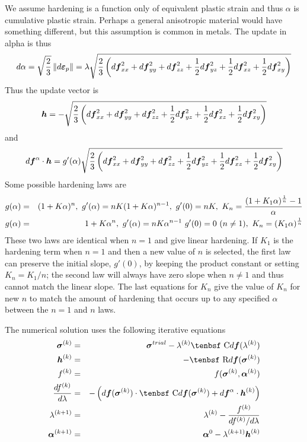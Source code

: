 \documentclass[11pt]{book}
\renewcommand{\vec}[1]{\boldsymbol{#1}}
\def\C{\hbox{\tenbsf C}}
\def\dpl{d \vec{\varepsilon}_{p}}
\def\df{d \vec{f}}
\def\dfa{d \vec{f}^\alpha}
\def\R{\hbox{\tenbsf R}}
\begin{document}
We assume hardening is a function only of equivalent plastic strain and thus $\alpha$ is cumulative plastic strain. Perhaps a general anisotropic material would have something different, but this assumption is common in metals. The update in alpha is thus
\begin{equation}
     d\alpha = \sqrt{2\over 3}\thinspace \| \dpl\| = \lambda \sqrt{{2\over 3}\left(\df_{xx}^2 + \df_{yy}^2 + \df_{zz}^2 + {1\over2}\df_{yz}^2+ {1\over2}\df_{xz}^2+ {1\over2}\df_{xy}^2\right)}
\end{equation}
Thus the update vector is
\begin{equation}
      \vec h = - \sqrt{{2\over 3}\left(\df_{xx}^2 + \df_{yy}^2 + \df_{zz}^2 + {1\over2}\df_{yz}^2+ {1\over2}\df_{xz}^2+ {1\over2}\df_{xy}^2\right)}
\end{equation}
and
\begin{equation}
   \dfa \cdot \vec h =  g'(\alpha)\sqrt{{2\over 3}\left(\df_{xx}^2 + \df_{yy}^2 + \df_{zz}^2 + {1\over2}\df_{yz}^2+ {1\over2}\df_{xz}^2 + {1\over2}\df_{xy}^2\right)}
\end{equation}
Some possible hardening laws are
\begin{eqnarray}
     g(\alpha)  & = & (1 + K\alpha)^n, \  g'(\alpha) =  nK(1+K\alpha)^{n-1}, \  g'(0)=nK, \  K_n={(1+K_1\alpha)^{1\over n} - 1\over \alpha}  \\
     g(\alpha)  & = & 1 + K\alpha^n, \  g'(\alpha) =  nK\alpha^{n-1} \  g'(0)=0\ (n\ne1), \ K_n = (K_1\alpha)^{1\over n}
\end{eqnarray}
These two laws are identical when $n=1$ and give linear hardening. If $K_1$ is the hardening term when $n=1$ and then a new value of $n$ is selected, the first law can preserve the initial slope, $g'(0)$, by keeping the product constant or setting $K_n = K_1/n$; the second law will always have zero slope when $n\ne1$ and thus cannot match the linear slope. The last equations for $K_n$ give the value of $K_n$ for new $n$ to match the amount of hardening that occurs up to any specified $\alpha$ between the $n=1$ and $n$ laws.

The numerical solution uses the following iterative equations
\begin{eqnarray}
       \vec\sigma^{(k)} & = & \vec\sigma^{trial} - \lambda^{(k)}\C\df(\lambda^{(k)}) \\
        \vec h^{(k)} & = & -\R\df(\vec\sigma^{(k)}) \\
        f^{(k)} & = &  f( \vec\sigma^{(k)},\vec\alpha^{(k)})  \\
        {df^{(k)}\over d\lambda} & = & -\left( \df(\vec\sigma^{(k)})\cdot \C\df(\vec\sigma^{(k)})  + \dfa \cdot \vec h^{(k)}\right) \\
        \lambda^{(k+1)} & = & \lambda^{(k)} - {f^{(k)} \over {df^{(k)}/ d\lambda} } \\
        \vec\alpha^{(k+1)} & = & \vec\alpha^{0} -  \lambda^{(k+1)} \vec h^{(k)}
\end{eqnarray}
\end{document}
